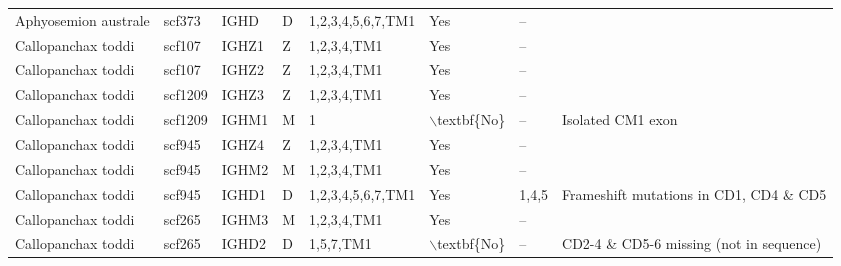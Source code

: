 \begin{tabular}{llllllll}
  Aphyosemion australe & scf373 & IGHD & D & 1,2,3,4,5,6,7,TM1 & Yes & -- &  \\ 
  Callopanchax toddi & scf107 & IGHZ1 & Z & 1,2,3,4,TM1 & Yes & -- &  \\ 
  Callopanchax toddi & scf107 & IGHZ2 & Z & 1,2,3,4,TM1 & Yes & -- &  \\ 
  Callopanchax toddi & scf1209 & IGHZ3 & Z & 1,2,3,4,TM1 & Yes & -- &  \\ 
  Callopanchax toddi & scf1209 & IGHM1 & M & 1 & $\backslash$textbf\{No\} & -- & Isolated CM1 exon \\ 
  Callopanchax toddi & scf945 & IGHZ4 & Z & 1,2,3,4,TM1 & Yes & -- &  \\ 
  Callopanchax toddi & scf945 & IGHM2 & M & 1,2,3,4,TM1 & Yes & -- &  \\ 
  Callopanchax toddi & scf945 & IGHD1 & D & 1,2,3,4,5,6,7,TM1 & Yes & 1,4,5 & Frameshift mutations in CD1, CD4 \& CD5 \\ 
  Callopanchax toddi & scf265 & IGHM3 & M & 1,2,3,4,TM1 & Yes & -- &  \\ 
  Callopanchax toddi & scf265 & IGHD2 & D & 1,5,7,TM1 & $\backslash$textbf\{No\} & -- & CD2-4 \& CD5-6 missing (not in sequence) \\ 
   \bottomrule \end{tabular}
